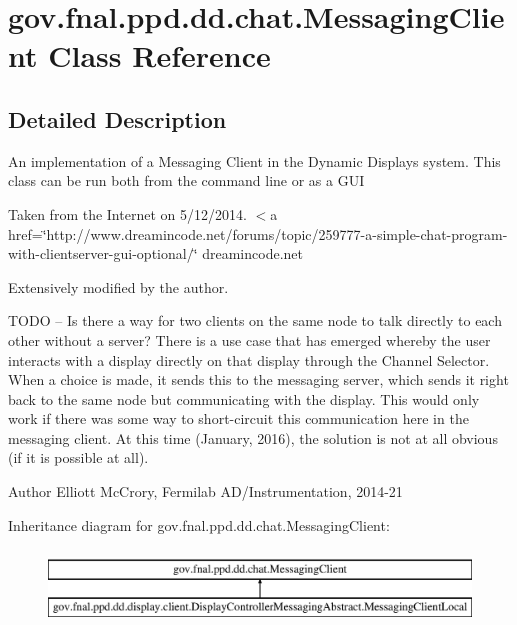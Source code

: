 \hypertarget{classgov_1_1fnal_1_1ppd_1_1dd_1_1chat_1_1MessagingClient}{\section{gov.\-fnal.\-ppd.\-dd.\-chat.\-Messaging\-Client Class Reference}
\label{classgov_1_1fnal_1_1ppd_1_1dd_1_1chat_1_1MessagingClient}
}


\subsection{Detailed Description}
An implementation of a Messaging Client in the Dynamic Displays system. This class can be run both from the command line or as a G\-U\-I 

Taken from the Internet on 5/12/2014. $<$a href=\char`\"{}http\-://www.\-dreamincode.\-net/forums/topic/259777-\/a-\/simple-\/chat-\/program-\/with-\/clientserver-\/gui-\/optional/\char`\"{} dreamincode.\-net 

Extensively modified by the author. 

T\-O\-D\-O -- Is there a way for two clients on the same node to talk directly to each other without a server? There is a use case that has emerged whereby the user interacts with a display directly on that display through the Channel Selector. When a choice is made, it sends this to the messaging server, which sends it right back to the same node but communicating with the display. This would only work if there was some way to short-\/circuit this communication here in the messaging client. At this time (January, 2016), the solution is not at all obvious (if it is possible at all). 

\begin{DoxyAuthor}{Author}
Elliott Mc\-Crory, Fermilab A\-D/\-Instrumentation, 2014-\/21 
\end{DoxyAuthor}
Inheritance diagram for gov.\-fnal.\-ppd.\-dd.\-chat.\-Messaging\-Client\-:\begin{figure}[H]
\begin{center}
\leavevmode
\includegraphics[height=2.000000cm]{classgov_1_1fnal_1_1ppd_1_1dd_1_1chat_1_1MessagingClient}
\end{center}
\end{figure}
